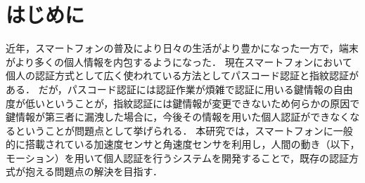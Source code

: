 \section{はじめに}
近年，スマートフォンの普及により日々の生活がより豊かになった一方で，端末がより多くの個人情報を内包するようになった．
現在スマートフォンにおいて個人の認証方式として広く使われている方法としてパスコード認証と指紋認証がある．
だが，パスコード認証には認証作業が煩雑で認証に用いる鍵情報の自由度が低いということが，指紋認証には鍵情報が変更できないため何らかの原因で鍵情報が第三者に漏洩した場合に，今後その情報を用いた個人認証ができなくなるということが問題点として挙げられる．
本研究では，スマートフォンに一般的に搭載されている加速度センサと角速度センサを利用し，人間の動き（以下，モーション）を用いて個人認証を行うシステムを開発することで，既存の認証方式が抱える問題点の解決を目指す．
